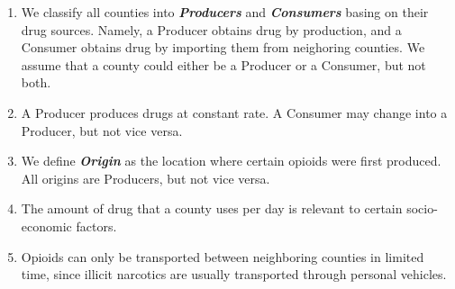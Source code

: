 \begin{enumerate}[$\mathcal{A}$1.]
	\item We classify all counties into \textbf{\itshape Producers} and \textbf{\itshape Consumers} basing on their drug sources. Namely, a Producer obtains drug by production, and a Consumer obtains drug by importing them from neighoring counties. We assume that a county could either be a Producer or a Consumer, but not both.
	
	\item A Producer produces drugs at constant rate. A Consumer may change into a Producer, but not vice versa.
	
	\item We define \textbf{\itshape Origin} as the location where certain opioids were first produced. All origins are Producers, but not vice versa.
	
	\item The amount of drug that a county uses per day is relevant to certain socio-economic factors.
	
	\item Opioids can only be transported between neighboring counties in limited time, since illicit narcotics are usually transported through personal vehicles.\cite{9}
	
\end{enumerate}